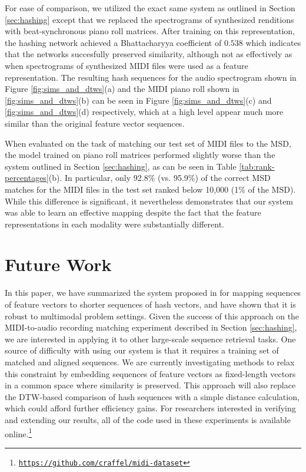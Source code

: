 \documentclass{article} %
\begin{document}
For ease of comparison, we utilized the exact same system as outlined in Section \ref{sec:hashing} except that we replaced the spectrograms of synthesized renditions with beat-synchronous piano roll matrices.
After training on this representation, the hashing network achieved a Bhattacharyya coefficient of $0.538$ which indicates that the networks succesfully preserved similarity, although not as effectively as when spectrograms of synthesized MIDI files were used as a feature representation.
The resulting hash sequences for the audio spectrogram shown in Figure \ref{fig:sims_and_dtws}(a) and the MIDI piano roll shown in \ref{fig:sims_and_dtws}(b) can be seen in Figure \ref{fig:sims_and_dtws}(c) and \ref{fig:sims_and_dtws}(d) respectively, which at a high level appear much more similar than the original feature vector sequences.

When evaluated on the task of matching our test set of MIDI files to the MSD, the model trained on piano roll matrices performed slightly worse than the system outlined in Section \ref{sec:hashing}, as can be seen in Table \ref{tab:rank-percentages}(b).
In particular, only 92.8\% (vs. 95.9\%) of the correct MSD matches for the MIDI files in the test set ranked below 10,000 (1\% of the MSD).
While this difference is significant, it nevertheless demonstrates that our system was able to learn an effective mapping despite the fact that the feature representations in each modality were substantially different.

\section{Future Work}

In this paper, we have summarized the system proposed in \cite{raffel2015large} for mapping sequences of feature vectors to shorter sequences of hash vectors, and have shown that it is robust to multimodal problem settings.
Given the success of this approach on the MIDI-to-audio recording matching experiment described in Section \ref{sec:hashing}, we are interested in applying it to other large-scale sequence retrieval tasks.
One source of difficulty with using our system is that it requires a training set of matched and aligned sequences.
We are currently investigating methods to relax this constraint by embedding sequences of feature vectors as fixed-length vectors in a common space where similarity is preserved.
This approach will also replace the DTW-based comparison of hash sequences with a simple distance calculation, which could afford further efficiency gains.
For researchers interested in verifying and extending our results, all of the code used in these experiments is available online.\footnote{\href{https://github.com/craffel/midi-dataset}{\texttt{https://github.com/craffel/midi-dataset}}}


\small

\end{document}

